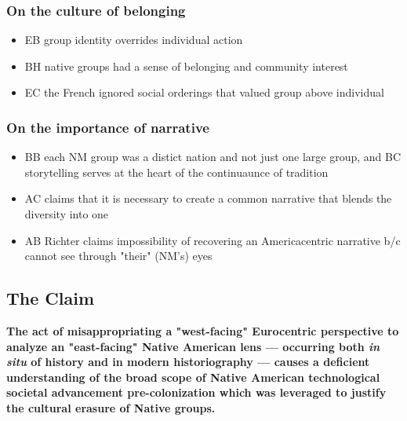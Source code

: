 \documentclass[letterpaper]{article}
\begin{document}
\subsubsection{On the culture of belonging}
\label{sec:org08b8859}
\begin{itemize}
\item EB group identity overrides individual action
\item BH native groups had a sense of belonging and community interest
\item EC the French ignored social orderings that valued group above individual
\end{itemize}

\subsubsection{On the importance of narrative}
\label{sec:org2afddc6}
\begin{itemize}
\item BB each NM group was a distict nation and not just one large group, and BC storytelling serves at the heart of the continuaunce of tradition
\item AC claims that it is necessary to create a common narrative that blends the diversity into one
\item AB Richter claims impossibility of recovering an Americacentric narrative b/c cannot see through "their" (NM's) eyes
\end{itemize}

\subsection{The Claim}
\label{sec:orge3b7bdd}
\textbf{\textbf{The act of misappropriating a "west-facing" Eurocentric perspective to analyze an "east-facing" Native American lens --- occurring both \emph{in situ} of history and in modern historiography --- causes a deficient understanding of the broad scope of Native American technological societal advancement pre-colonization which was leveraged to justify the cultural erasure of Native groups.}}
\end{document}
